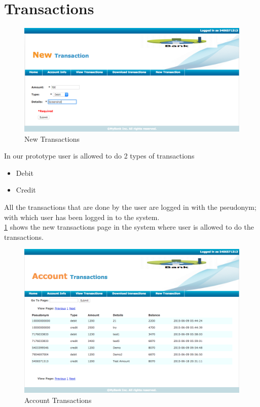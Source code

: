 \section{Transactions}
\begin{figure}
	\centering
	\includegraphics[width=\textwidth]{figures/New}
	\caption{New Transactions}
	\label{fig:New}
\end{figure}
In our prototype user is allowed to do 2 types of transactions
\begin{itemize}
	\item Debit
	\item Credit
\end{itemize}
All the transactions that are done by the user are logged in with the pseudonym; with which user has been logged in to the system.
\\\ref{fig:New} shows the new transactions page in the system where user is allowed to do the transactions.
\begin{figure}[h]
		\centering
		\includegraphics[width=\textwidth]{figures/Transactions}
		\caption{Account Transactions}
		\label{fig:Transactions}
\end{figure}
